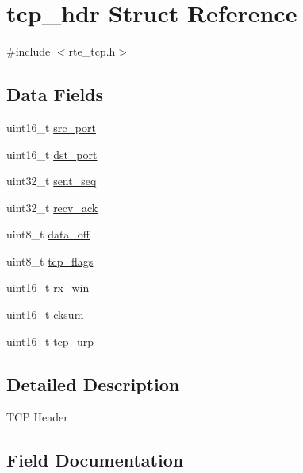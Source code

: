 \hypertarget{structtcp__hdr}{}\section{tcp\+\_\+hdr Struct Reference}
\label{structtcp__hdr}


{\ttfamily \#include $<$rte\+\_\+tcp.\+h$>$}

\subsection*{Data Fields}
\begin{DoxyCompactItemize}
\item 
uint16\+\_\+t \hyperlink{structtcp__hdr_ab98974981cf4c143fcee028643f313e6}{src\+\_\+port}
\item 
uint16\+\_\+t \hyperlink{structtcp__hdr_ae18defed4756b8c15e34718f51e86e55}{dst\+\_\+port}
\item 
uint32\+\_\+t \hyperlink{structtcp__hdr_abd310b02bdd70401a746bd58b2a2ba66}{sent\+\_\+seq}
\item 
uint32\+\_\+t \hyperlink{structtcp__hdr_ae801c1265636329c0552f28cee603098}{recv\+\_\+ack}
\item 
uint8\+\_\+t \hyperlink{structtcp__hdr_abbef1ad55c650013d2e0034b6e51cf83}{data\+\_\+off}
\item 
uint8\+\_\+t \hyperlink{structtcp__hdr_ab393c6d5f386ec83c49c7e1496fbb0e1}{tcp\+\_\+flags}
\item 
uint16\+\_\+t \hyperlink{structtcp__hdr_ac137de069426e30b2277dc58b664c6fb}{rx\+\_\+win}
\item 
uint16\+\_\+t \hyperlink{structtcp__hdr_a749687f86afcc33e9d390500910ef60d}{cksum}
\item 
uint16\+\_\+t \hyperlink{structtcp__hdr_a1296ff9f24d461b188d953f1b56f6d1f}{tcp\+\_\+urp}
\end{DoxyCompactItemize}


\subsection{Detailed Description}
T\+C\+P Header 

\subsection{Field Documentation}
\hypertarget{structtcp__hdr_a749687f86afcc33e9d390500910ef60d}{}
